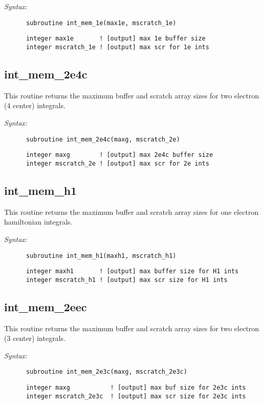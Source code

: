 {\it Syntax:} 
\begin{verbatim} 
      subroutine int_mem_1e(max1e, mscratch_1e) 
\end{verbatim} 
\begin{verbatim} 
      integer max1e       ! [output] max 1e buffer size 
      integer mscratch_1e ! [output] max scr for 1e ints 
\end{verbatim} 
\subsection{int\_mem\_2e4c} 
This routine returns the maximum buffer and scratch array 
sizes for two electron (4 center) 
integrals. 
 
{\it Syntax:} 
\begin{verbatim} 
      subroutine int_mem_2e4c(maxg, mscratch_2e) 
\end{verbatim} 
\begin{verbatim} 
      integer maxg        ! [output] max 2e4c buffer size 
      integer mscratch_2e ! [output] max scr for 2e ints 
\end{verbatim} 
\subsection{int\_mem\_h1} 
This routine returns the maximum buffer and scratch array 
sizes for one electron hamiltonian  
integrals. 
 
{\it Syntax:} 
\begin{verbatim} 
      subroutine int_mem_h1(maxh1, mscratch_h1) 
\end{verbatim} 
\begin{verbatim} 
      integer maxh1       ! [output] max buffer size for H1 ints 
      integer mscratch_h1 ! [output] max scr size for H1 ints 
\end{verbatim} 
\subsection{int\_mem\_2eec} 
This routine returns the maximum buffer and scratch array 
sizes for two electron (3 center) 
integrals. 
 
{\it Syntax:} 
\begin{verbatim} 
      subroutine int_mem_2e3c(maxg, mscratch_2e3c) 
\end{verbatim} 
\begin{verbatim} 
      integer maxg           ! [output] max buf size for 2e3c ints 
      integer mscratch_2e3c  ! [output] max scr size for 2e3c ints 
\end{verbatim} 
